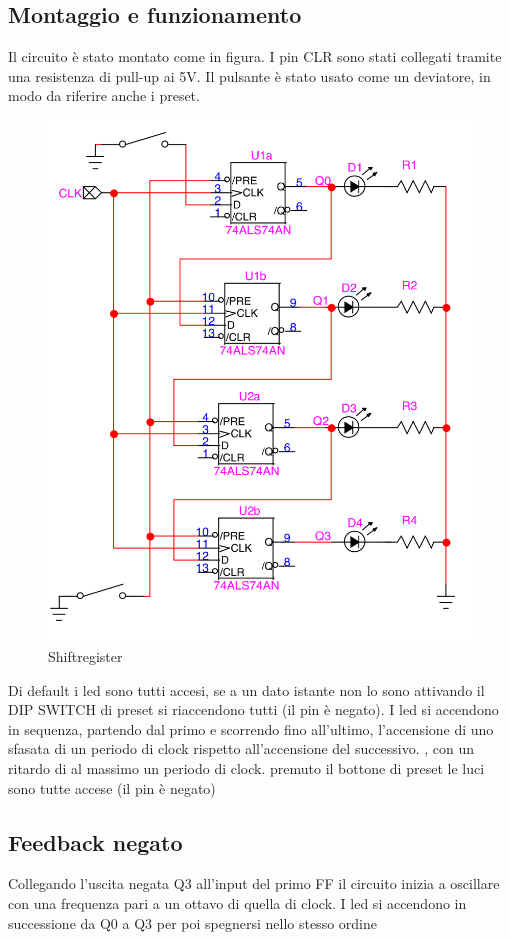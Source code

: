 \documentclass[10pt,a4paper]{article}
\begin{document}
\subsection{Montaggio e funzionamento}
Il circuito è stato montato come in figura. I pin CLR sono stati collegati tramite una resistenza di pull-up ai 5V. Il pulsante è stato usato come un deviatore, in modo da riferire anche i preset.
\begin{figure}[h]
	\includegraphics[scale=1]{circuito3.png}
	\caption{Shiftregister}                                
\end{figure}
Di default i led sono tutti accesi, se a un dato istante non lo sono  attivando il DIP SWITCH di preset si riaccendono tutti (il pin è negato). I led si accendono in sequenza, partendo dal primo e scorrendo fino all'ultimo, l'accensione di uno sfasata di un periodo di clock rispetto all'accensione del successivo. , con un ritardo di al massimo un periodo di clock. premuto il bottone di preset le luci sono tutte accese (il pin è negato)

\subsection{Feedback negato}
Collegando l'uscita negata Q3 all'input del primo FF il circuito inizia a oscillare con una frequenza pari a un ottavo di quella di clock. I led si accendono in successione da Q0 a Q3 per poi spegnersi nello stesso ordine
\end{document}
